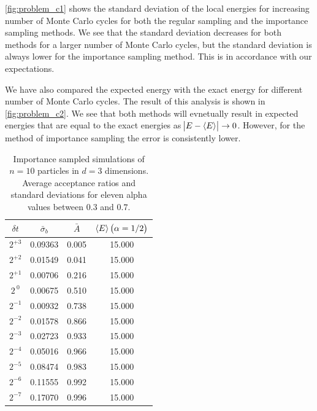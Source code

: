 \documentclass[
    a4paper, aps, twocolumn, floatfix, superscriptaddress, nofootinbib]{revtex4-1}
\newcommand{\1}{\mathds{1}}
\begin{document}
            \autoref{fig:problem_c1} shows the standard deviation of the local
            energies for increasing number of Monte Carlo cycles for both the
            regular sampling and the importance sampling methods. We see that
            the standard deviation decreases for both methods for a larger
            number of Monte Carlo cycles, but the standard deviation is always
            lower for the importance sampling method. This is in accordance with
            our expectations.

            We have also compared the expected energy with the exact energy for
            different number of Monte Carlo cycles. The result of this analysis
            is shown in \autoref{fig:problem_c2}. We see that both methods will
            evnetually result in expected energies that are equal to the exact
            energies as $\abs{E - \expval{E}} \to 0$. However, for the method of
            importance sampling the error is consistently lower.

            \begin{table}
                \caption{Importance sampled simulations of $n=10$ particles in
                $d=3$ dimensions. Average acceptance ratios and standard
                deviations for eleven alpha values between $0.3$ and $0.7$.}
                \centering
                    \begin{ruledtabular}
                        \begin{tabular}{cccc}
                            $\delta t$ & $\bar{\sigma}_b$ & $\bar{A}$
                            & $\expval{E}\left(\alpha = 1/2\right)$ \\
                            \hline
                            $2^{+3}$ & 0.09363 & 0.005 & 15.000 \\
                            $2^{+2}$ & 0.01549  & 0.041 & 15.000 \\
                            $2^{+1}$ & 0.00706 & 0.216 & 15.000 \\
                            $2^{\ 0}$ & 0.00675 & 0.510 & 15.000 \\
                            $2^{-1}$ & 0.00932 & 0.738 & 15.000 \\
                            $2^{-2}$ & 0.01578 & 0.866 & 15.000 \\
                            $2^{-3}$ & 0.02723 & 0.933 & 15.000 \\
                            $2^{-4}$ & 0.05016 & 0.966 & 15.000 \\
                            $2^{-5}$ & 0.08474 & 0.983 & 15.000 \\
                            $2^{-6}$ & 0.11555 & 0.992 & 15.000 \\
                            $2^{-7}$ & 0.17070 & 0.996 & 15.000 \\
                        \end{tabular}
                    \end{ruledtabular}
                    \label{tab:imp_time_step}
            \end{table}
\end{document}
